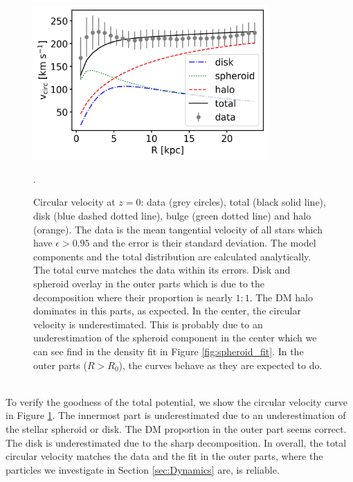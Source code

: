 \begin{figure}[htbp]
\captionsetup{format=plain}
\centering
\includegraphics[width=0.8\textwidth]{plots/Auriga/best_fit_circular_velocity_via_formula_snap_127.png}
\caption{Circular velocity at $z = 0$: data (grey circles), total (black solid line), disk (blue dashed dotted line), bulge (green dotted line) and halo (orange). The data is the mean tangential velocity of all stars which have $\epsilon > 0.95$ and the error is their standard deviation. The model components and the total distribution are calculated analytically. The total curve matches the data within its errors. Disk and spheroid overlay in the outer parts which is due to the decomposition where their proportion is nearly $1:1$. The \ac{DM} halo dominates in this parts, as expected. In the center, the circular velocity is underestimated. This is probably due to an underestimation of the spheroid component in the center which we can see find in the density fit in Figure \ref{fig:spheroid_fit}. In the outer parts ($R>R_0$), the curves behave as they are expected to do.}. \label{fig:circ_vel_fit}
\end{figure}
\\To verify the goodness of the total potential, we show the circular velocity curve in Figure \ref{fig:circ_vel_fit}. The innermost part is underestimated due to an underestimation of the stellar spheroid or disk. The \ac{DM} proportion in the outer part seems correct. The disk is underestimated due to the sharp decomposition. In overall, the total circular velocity matches the data and the fit in the outer parts, where the particles we investigate in Section \ref{sec:Dynamics} are, is reliable.  
 
